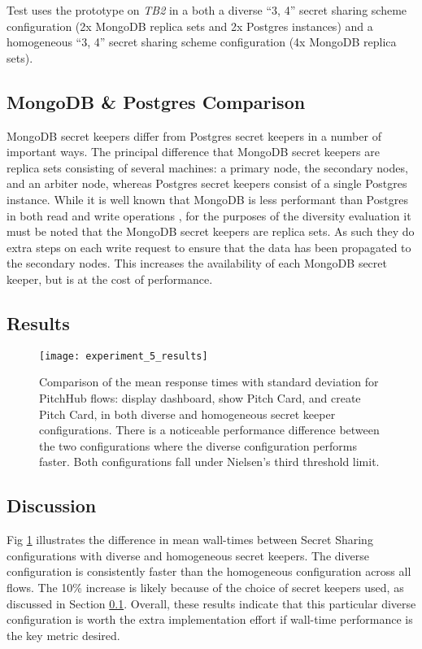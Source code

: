 Test  uses the prototype on \textit{TB2} in a both a diverse ``3, 4'' secret sharing scheme configuration (2x MongoDB replica sets and 2x Postgres instances) and a homogeneous ``3, 4'' secret sharing scheme configuration (4x MongoDB replica sets).

\subsection{MongoDB \& Postgres Comparison}\label{ss:mongoVsPostgres}

MongoDB secret keepers differ from Postgres secret keepers in a number of important ways. The principal difference that MongoDB secret keepers are replica sets consisting of several machines: a primary node, the secondary nodes, and an arbiter node, whereas Postgres secret keepers consist of a single Postgres instance. While it is well known that MongoDB is less performant than Postgres in both read and write operations \cite{van2012sensor}, for the purposes of the diversity evaluation it must be noted that the MongoDB secret keepers are replica sets. As such they do extra steps on each write request to ensure that the data has been propagated to the secondary nodes. This increases the availability of each MongoDB secret keeper, but is at the cost of performance.

\subsection{Results}

\begin{figure}[ht]
    \centering
    \texttt{[image: experiment\_5\_results]}
    \caption{Comparison of the mean response times with standard deviation for PitchHub flows: display dashboard, show Pitch Card, and create Pitch Card, in both diverse and homogeneous secret keeper configurations. There is a noticeable performance difference between the two configurations where the diverse configuration performs faster. Both configurations fall under Nielsen's third threshold limit.}
    \label{fig:test_5_results}
\end{figure}

\subsection{Discussion}
Fig \ref{fig:test_5_results} illustrates the difference in mean wall-times between Secret Sharing configurations with diverse and homogeneous secret keepers. The diverse configuration is consistently faster than the homogeneous configuration across all flows. The 10\% increase is likely because of the choice of secret keepers used, as discussed in Section \ref{ss:mongoVsPostgres}.
Overall, these results indicate that this particular diverse configuration is worth the extra implementation effort if wall-time performance is the key metric desired. 

